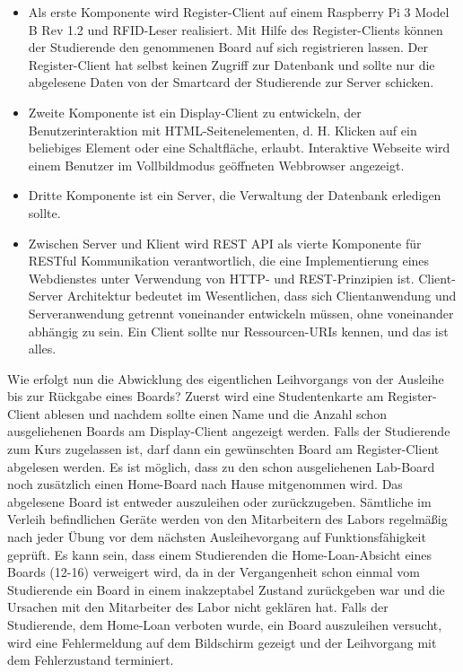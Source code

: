 \begin{itemize}
	\item Als erste Komponente wird Register-Client auf einem Raspberry Pi 3 Model B Rev 1.2 und RFID-Leser realisiert. Mit Hilfe des Register-Clients können der Studierende den genommenen Board auf sich registrieren lassen. Der Register-Client hat selbst keinen Zugriff zur Datenbank und sollte nur die abgelesene Daten von der Smartcard der Studierende zur Server schicken. 
	\item Zweite Komponente ist ein Display-Client zu entwickeln, der Benutzerinteraktion mit HTML-Seitenelementen, d. H. Klicken auf ein beliebiges Element oder eine Schaltfläche, erlaubt. Interaktive Webseite wird einem Benutzer im Vollbildmodus geöffneten Webbrowser angezeigt.
	\item Dritte Komponente ist ein Server, die Verwaltung der Datenbank erledigen sollte.
	\item Zwischen Server und Klient wird REST API als vierte Komponente für RESTful Kommunikation verantwortlich, die eine Implementierung eines Webdienstes unter Verwendung von HTTP- und REST-Prinzipien ist. Client-Server Architektur bedeutet im Wesentlichen, dass sich Clientanwendung und Serveranwendung getrennt voneinander entwickeln müssen, ohne voneinander abhängig zu sein. Ein Client sollte nur Ressourcen-URIs kennen, und das ist alles.
\end{itemize}

Wie erfolgt nun die Abwicklung des eigentlichen Leihvorgangs von der Ausleihe bis zur Rückgabe eines Boards?  Zuerst wird eine Studentenkarte am Register-Client ablesen und nachdem sollte einen Name und die Anzahl schon ausgeliehenen Boards am Display-Client angezeigt werden. Falls der Studierende zum Kurs zugelassen ist, darf dann ein gewünschten Board am Register-Client abgelesen werden. Es ist möglich, dass zu den schon ausgeliehenen Lab-Board noch zusätzlich einen Home-Board nach Hause mitgenommen wird. Das abgelesene Board ist entweder auszuleihen oder zurückzugeben. Sämtliche im Verleih befindlichen Geräte werden von den Mitarbeitern des Labors regelmäßig nach jeder Übung vor dem nächsten Ausleihevorgang auf Funktionsfähigkeit geprüft. Es kann sein, dass einem Studierenden die Home-Loan-Absicht eines Boards (12-16) verweigert wird, da in der Vergangenheit schon einmal vom Studierende ein Board in einem inakzeptabel Zustand zurückgeben war und die Ursachen mit den Mitarbeiter des Labor nicht geklären hat. Falls der Studierende, dem Home-Loan verboten wurde, ein Board auszuleihen versucht, wird eine Fehlermeldung auf dem Bildschirm gezeigt und der Leihvorgang mit dem Fehlerzustand terminiert.  


